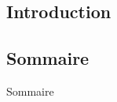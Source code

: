 \subsection*{Introduction}
\begin{frame}
\titlepage
\end{frame}

\subsection*{Sommaire}
\begin{frame}{Sommaire}
	\setlength{\columnsep}{2cm}
	\setlength{\columnseprule}{1pt}
	\begin{multicols}{2}
		\tableofcontents
	\end{multicols}
\end{frame}